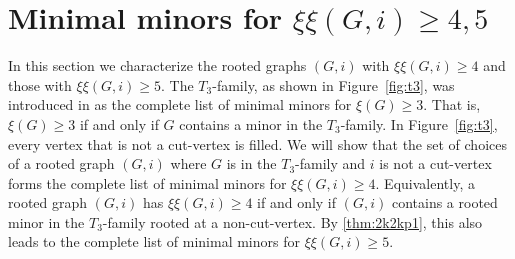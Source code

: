 \documentclass{article}
\theoremstyle{definition}
\newcommand{\excise}{\xi\xi}
\begin{document}
\section{Minimal minors for \texorpdfstring{$\excise(G, i)\geq 4,5$}{xixi(G, i) >= 4,5}}
\label{sec:excise45}
In this section we  characterize the rooted graphs $(G,i)$ with $\excise(G,i)\geq 4$ and those with $\excise(G,i) \geq 5$.  The $T_3$-family, as shown in Figure~\ref{fig:t3}, was introduced in \cite{HvdH07} as the complete list of minimal minors for $\xi(G) \geq 3$.  That is, $\xi(G) \geq 3$ if and only if $G$ contains a minor in the $T_3$-family.  In Figure~\ref{fig:t3}, every vertex that is not a cut-vertex is filled.
We will show that the set of choices of a rooted graph $(G,i)$ where $G$ is in the $T_3$-family and $i$ is not a cut-vertex forms the complete list of minimal minors for $\excise(G, i) \geq 4$.
Equivalently, a rooted graph $(G,i)$ has $\excise(G,i) \geq 4$ if and only if $(G,i)$ contains a rooted minor in the $T_3$-family rooted at a non-cut-vertex.
By \cref{thm:2k2kp1}, this also leads to the complete list of minimal minors for $\excise(G, i) \geq 5$.  
\end{document}
